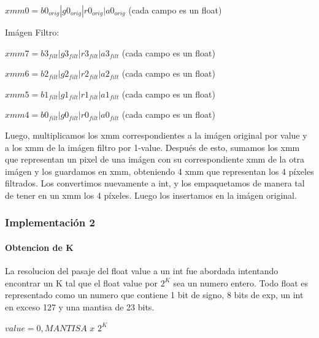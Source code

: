 \documentclass[a4paper]{article}
\begin{document}
$xmm0 = b0_{orig} | g0_{orig} | r0_{orig} | a0_{orig}$   (cada campo es un float)

\vspace*{0.3cm}

Imágen Filtro:

\vspace*{0.3cm}

$xmm7 = b3_{filt} | g3_{filt} | r3_{filt} | a3_{filt}$   (cada campo es un float)

\vspace*{0.3cm}

$xmm6 = b2_{filt} | g2_{filt} | r2_{filt} | a2_{filt}$   (cada campo es un float)

\vspace*{0.3cm}

$xmm5 = b1_{filt} | g1_{filt} | r1_{filt} | a1_{filt}$   (cada campo es un float)

\vspace*{0.3cm}

$xmm4 = b0_{filt} | g0_{filt} | r0_{filt} | a0_{filt}$   (cada campo es un float)

\vspace*{0.3cm}

Luego, multiplicamos los xmm correspondientes a la imágen original por value y a los xmm de la imágen filtro por 1-value. Después de esto, sumamos los xmm que representan un pixel de una imágen con su correspondiente xmm de la otra imágen y los guardamos en xmm, obteniendo 4 xmm que representan los 4 píxeles filtrados. Los convertimos nuevamente a int, y los empaquetamos de manera tal de tener en un xmm los 4 píxeles. Luego los insertamos en la imágen original.

\vspace*{0.3cm}

\subsubsection{Implementación 2}

\paragraph*{Obtencion de K}
	La resolucion del pasaje del float value a un int fue abordada intentando encontrar un K tal que el float value por $2^K$ sea un numero entero.
	Todo float es representado como un numero que contiene 1 bit de signo, 8 bits de exp, un int en exceso 127 y una mantisa de 23 bits.

	$value=0,MANTISA$ $x$ $2^K$
\end{document}
